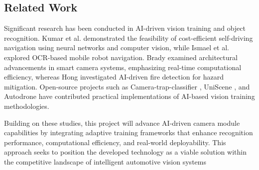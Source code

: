 \documentclass[journal,transmag]{IEEEtran}
\begin{document}

\subsection{Related Work}

Significant research has been conducted in AI-driven vision training and object recognition. Kumar et al. \cite{SelfDriving} demonstrated the feasibility of cost-efficient self-driving navigation using neural networks and computer vision, while Ismael et al. \cite{Controlling Mobile Robot} explored OCR-based mobile robot navigation. Brady \cite{Smart Cameras} examined architectural advancements in smart camera systems, emphasizing real-time computational efficiency, whereas Hong \cite{Design and Realization} investigated AI-driven fire detection for hazard mitigation. Open-source projects such as Camera-trap-classifier \cite{Camera-trap-classifier}, UniScene \cite{UniScene}, and Autodrone \cite{Autodrone} have contributed practical implementations of AI-based vision training methodologies.

Building on these studies, this project will advance AI-driven camera module capabilities by integrating adaptive training frameworks that enhance recognition performance, computational efficiency, and real-world deployability. This approach seeks to position the developed technology as a viable solution within the competitive landscape of intelligent automotive vision systems




%
%
\end{document}
